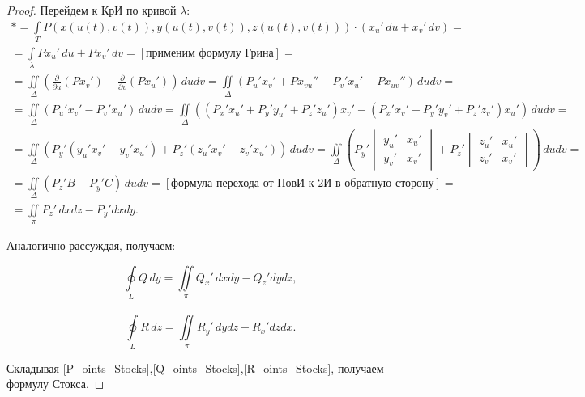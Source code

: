 \documentclass[../../main.tex]{subfiles}
\begin{document}
\begin{proof}
			 Перейдем к КрИ по кривой $\lambda$:
			 \begin{gather*}
			 * = \int \limits_T P ( x( u( t), v( t)   ), y( u( t), v( t)   )  ,z( u( 
			 t), v( t)   ) )\cdot( x_u' \, du + x_v ' \, dv ) =  \\
			 = \int \limits_{\lambda} P x_u' \, du +  P x_v' \, dv =  \left[   
			 \text{применим формулу Грина}  \right] = \\
			 = \iint \limits_{\Delta} \left( \frac{\partial}{\partial{u}} (P x_v') - 
			 \frac{\partial}{\partial{v}} (P x_u') \right) \, du dv = \iint 
			 \limits_{\Delta} \left(
			 P_u' x_v ' + P x_{vu} '' - P_v' x_u' - P x_{uv}'' \right) \, du dv  =  \\
			 = \iint \limits_{\Delta} \left(
			 P_u' x_v ' - P_v' x_u' \right) \, du dv  = \iint \limits_{\Delta} \left( 
			 \left( P_x' x_u' + P_y' y_u' + P_z ' z_u' \right) x_v' - \left( P_x' x_v' 
			 + P_y' y_v' + P_z ' z_v' \right) x_u'  \right) \, du dv =  \\
			 = \iint \limits_{\Delta} \left( P_y'\left( y_u' x_v' - y_v' x_u' \right) + 
			 P_z'\left( z_u' x_v' - z_v' x_u' \right)   \right) \, du dv = \iint 
			 \limits_{\Delta} \left( P_y' \begin{vmatrix} y_u' & x_u' \\ y_v' & x_v'  
			 \end{vmatrix} + P_z' \begin{vmatrix} z_u' & x_u' \\ z_v' & x_v'  
			 \end{vmatrix} \right) \, dudv =      \\
			 = \iint \limits_{\Delta}  \left( P_z' B - P_y' C  \right) \, dudv = 
			 [\text{формула перехода от ПовИ к 2И в обратную сторону}] = \\ = \iint 
			 \limits_{\pi}  P_z' \, dxdz - P_y' dxdy.     \end{gather*}
			
			Аналогично рассуждая, получаем:
			
			\begin{equation}  \label{Q_oints_Stocks} \oint \limits_L Q \, dy = \iint 
			\limits_{\pi}  Q_x' \, dxdy - Q_z' dydz, \end{equation}\\
			\begin{equation}  \label{R_oints_Stocks} \oint \limits_L R \, dz = \iint 
			\limits_{\pi}  R_y' \, dydz - R_x' dzdx. \end{equation}
			
			Складывая 
			\eqref{P_oints_Stocks},\eqref{Q_oints_Stocks},\eqref{R_oints_Stocks}, 
			получаем формулу Стокса.
		\end{proof}	
			
\end{document}
